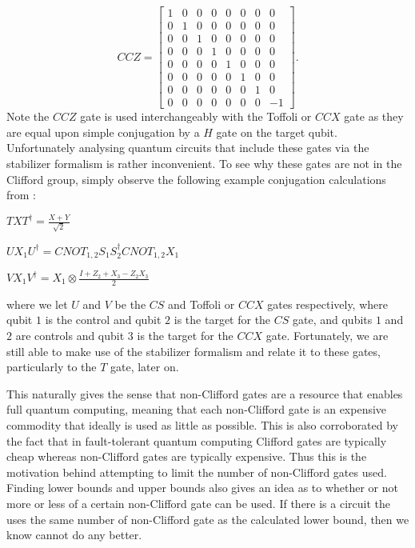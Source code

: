 \documentclass[12pt]{dalthesis}
\begin{document}
\begin{equation*}
CCZ = 
\begin{bmatrix}
1 & 0 & 0 & 0 & 0 & 0 & 0 & 0 \\
0 & 1 & 0 & 0 & 0 & 0 & 0 & 0 \\
0 & 0 & 1 & 0 & 0 & 0 & 0 & 0 \\
0 & 0 & 0 & 1 & 0 & 0 & 0 & 0 \\
0 & 0 & 0 & 0 & 1 & 0 & 0 & 0 \\
0 & 0 & 0 & 0 & 0 & 1 & 0 & 0 \\
0 & 0 & 0 & 0 & 0 & 0 & 1 & 0 \\
0 & 0 & 0 & 0 & 0 & 0 & 0 & -1 
\end{bmatrix}.
\end{equation*}
Note the $CCZ$ gate is used interchangeably with the Toffoli or $CCX$ gate as they are equal upon simple conjugation by a $H$ gate on the target qubit. Unfortunately analysing quantum circuits that include these gates via the stabilizer formalism is rather inconvenient. To see why these gates are not in the Clifford group, simply observe the following example conjugation calculations from \cite{beverland2019lower}:
\begin{center}
$TXT^{\dag} = \frac{X+Y}{\sqrt{2}}$
\end{center}
\begin{center}
$UX_1U^{\dag} = CNOT_{1,2}S_1S_2^{\dag}CNOT_{1, 2}X_1$
\end{center}
\begin{center}
$VX_1V^{\dag} = X_1 \otimes \frac{I + Z_2 +X_3 -Z_2X_3}{2}$
\end{center}
where we let $U$ and $V$ be the $CS$ and Toffoli or $CCX$ gates respectively, where qubit $1$ is the control and qubit $2$ is the target for the $CS$ gate, and qubits $1$ and $2$ are controls and qubit $3$ is the target for the $CCX$ gate. Fortunately, we are still able to make use of the stabilizer formalism and relate it to these gates, particularly to the $T$ gate, later on.

This naturally gives the sense that non-Clifford gates are a resource that enables full quantum computing, meaning that each non-Clifford gate is an expensive commodity that ideally is used as little as possible. This is also corroborated by the fact that in fault-tolerant quantum computing Clifford gates are typically cheap whereas non-Clifford gates are typically expensive. Thus this is the motivation behind attempting to limit the number of non-Clifford gates used. Finding lower bounds and upper bounds also gives an idea as to whether or not more or less of a certain non-Clifford gate can be used. If there is a circuit the uses the same number of non-Clifford gate as the calculated lower bound, then we know cannot do any better.
\end{document}
